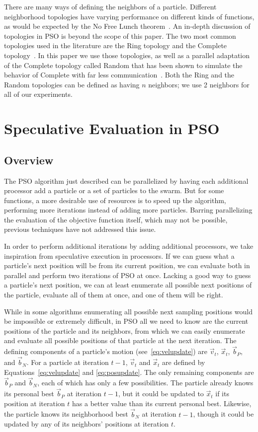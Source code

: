\documentclass[journal,letterpaper]{IEEEtran}
\providecommand{\ppos}{\ensuremath{\Vec{x}}}
\providecommand{\pvel}{\ensuremath{\Vec{v}}}
\providecommand{\nbest}{\ensuremath{\Vec{b}_N}}
\providecommand{\pbest}{\ensuremath{\Vec{b}_P}}
\begin{document}
There are many ways of defining the neighbors of a particle.  Different
neighborhood topologies have varying performance on different kinds of
functions, as would be expected by the No Free Lunch
theorem~\cite{wolpert-tec97}.  An in-depth discussion of topologies in PSO is
beyond the scope of this paper.  The two most common topologies used in the
literature are the Ring topology and the Complete
topology~\cite{bratton-sis07}.  In this paper we use those topologies, as well
as a parallel adaptation of the Complete topology called Random that has been
shown to simulate the behavior of Complete with far less
communication~\cite{mcnabb-cec09}.  Both the Ring and the Random topologies can
be defined as having $n$ neighbors; we use 2 neighbors for all of our
experiments.

\section{Speculative Evaluation in PSO}
\label{sec:sepso}
\subsection{Overview}

The PSO algorithm just described can be parallelized by having each additional
processor add a particle or a set of particles to the swarm.  But for some
functions, a more desirable use of resources is to speed up the algorithm,
performing more iterations instead of adding more particles.  Barring
parallelizing the evaluation of the objective function itself, which may not be
possible, previous techniques have not addressed this issue.

In order to perform additional iterations by adding additional processors, we
take inspiration from speculative execution in processors.  If we can guess
what a particle's next position will be from its current position, we can
evaluate both in parallel and perform two iterations of PSO at once.  Lacking
a good way to guess a particle's next position, we can at least enumerate all
possible next positions of the particle, evaluate all of them at once, and one
of them will be right.

While in some algorithms enumerating all possible next sampling positions would
be impossible or extremely difficult, in PSO all we need to know are the
current positions of the particle and its neighbors, from which we can easily
enumerate and evaluate all possible positions of that particle at the next
iteration.  The defining components of a particle's motion
(see~\eqref{eq:velupdate}) are $\pvel_t$, $\ppos_t$, $\pbest$, and $\nbest$.
For a particle at iteration $t-1$, $\pvel_t$ and $\ppos_t$ are defined by
Equations~\eqref{eq:velupdate} and \eqref{eq:posupdate}.  The only remaining
components are $\pbest$ and $\nbest$, each of which has only a few
possibilities.  The particle already knows its personal best $\pbest$ at
iteration $t-1$, but it could be updated to $\ppos_t$ if its position at
iteration $t$ has a better value than its current personal best.  Likewise, the
particle knows its neighborhood best $\nbest$ at iteration $t-1$, though it
could be updated by any of its neighbors' positions at iteration $t$.
\end{document}
